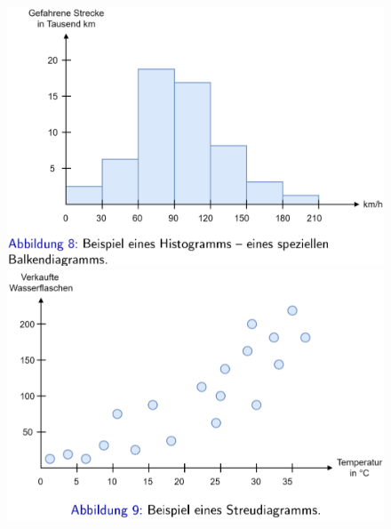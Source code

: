\documentclass{report}
\begin{document}
\begin{figure}[H]
  \centering
  \begin{minipage}[b]{0.4\textwidth}
    \includegraphics[scale=.25]{ml01_6}
  \end{minipage}
  \hfill
  \begin{minipage}[b]{0.4\textwidth}
    \includegraphics[scale=.25]{ml01_7}
  \end{minipage}
\end{figure}
\end{document}
